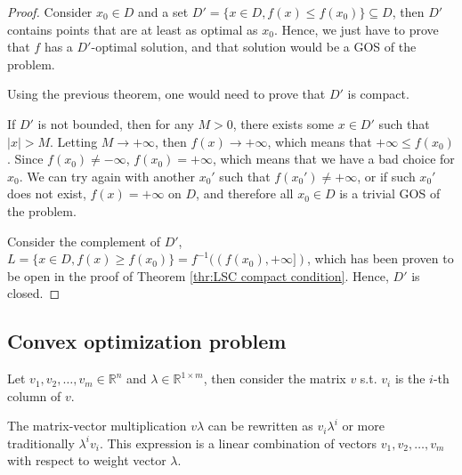 \begin{proof}
  Consider \( x_{0} \in D \) and a set \( D' = \{x \in D, f(x) \le f(x_{0})\}
  \subseteq D \), then \( D' \) contains points that are at least as optimal as
  \( x_{0} \). Hence, we just have to prove that \( f \) has a \( D' \)-optimal
  solution, and that solution would be a GOS of the problem.

  Using the previous theorem, one would need to prove that \( D' \) is compact.
  
  If \( D' \) is not bounded, then for any \( M > 0 \), there exists some \( x
  \in D' \) such that \( |x| > M \). Letting \( M \to  +\infty \), then \( f(x)
  \to  +\infty\), which means that \( +\infty \le f(x_{0}) \). Since \(
  f(x_{0}) \neq  -\infty \), \( f(x_{0}) = +\infty \), which means that we have
  a bad choice for \( x_{0} \). We can try again with another \( x_{0}' \) such
  that \( f(x_{0}') \neq +\infty \), or if such \( x_{0}'\) does not exist, \(
  f(x) = +\infty \) on \( D \), and therefore all \( x_{0} \in D \) is a trivial GOS of
  the problem.

  Consider the complement of \( D' \), \( L = \{x \in D, f(x) \ge  f(x_{0})\} =
  f^{-1}((f(x_{0}), +\infty])  \), which has been proven to be open in the proof
  of Theorem \ref{thr:LSC compact condition}. Hence, \( D' \) is closed.
\end{proof}


\subsection{Convex optimization problem} %
\label{sub:Convex optimization problem}

Let \( v_{1}, v_{2}, \ldots , v_{m} \in \mathbb{R}^{n} \) and \( \lambda \in
\mathbb{R}^{1\times m} \), then consider the matrix \( v \) s.t. \( v_{i} \) is
the \( i \)-th column of \( v \).

The matrix-vector multiplication \( v \lambda \) can be rewritten as \( v_{i}
\lambda^{i} \) or more traditionally \( \lambda^{i}v_{i} \). This expression is
a linear combination of vectors \( v_{1}, v_{2}, \ldots , v_{m} \) with respect
to weight vector \( \lambda \).

